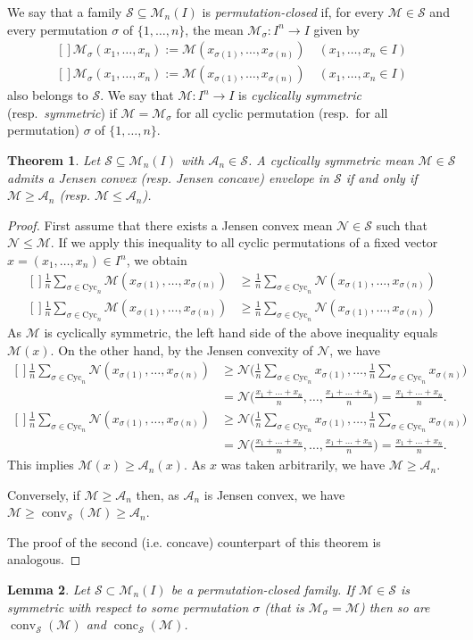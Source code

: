 \documentclass[12pt,oneside]{amsart}
\newtheorem{thm}{Theorem}[section]
\newtheorem{lem}[thm]{Lemma}
\theoremstyle{definition}
\numberwithin{equation}{section}
\def\Eq#1#2{\ifthenelse{\equal{#1}{*}}
  {\begin{equation*}\begin{aligned}[]#2\end{aligned}\end{equation*}}
  {\begin{equation}\begin{aligned}[]\label{#1}#2\end{aligned}\end{equation}}}
\def\A{\mathscr{A}}
\def\M{\mathscr{M}}
\def\Nm{\mathscr{N}}
\def\S{\mathcal{S}}
\def\calM{\mathcal{M}}
\newcommand\Cyc{\textrm{Cyc}}
\DeclareMathOperator{\conv}{conv}
\DeclareMathOperator{\conc}{conc}
\begin{document}
We say that a family $\S \subseteq \calM_n(I)$ is \emph{permutation-closed} if, for every $\M \in \S$ and every permutation $\sigma$ of $\{1,\dots,n\}$, the mean $\M_\sigma\colon I^n \to I$ given by
\Eq{*}{
\M_{\sigma}(x_1,\dots,x_n):= \M(x_{\sigma(1)},\dots,x_{\sigma(n)})
\quad (x_1,\dots,x_n \in I)}
also belongs to $\S$. We say that $\M\colon I^n\to I$ is \emph{cyclically symmetric} (resp.\ \emph{symmetric}) if $\M=\M_\sigma$ for all cyclic permutation (resp.\ for all permutation) $\sigma$ of $\{1,\dots,n\}$. 

\begin{thm}\label{thm:M-A}
Let $\S\subseteq\calM_n(I)$ with $\A_n \in \S$. A cyclically symmetric mean $\M \in \S$ admits a Jensen convex (resp. Jensen concave) envelope in $\S$ if and only if $\M \ge \A_n$ (resp. $\M \le \A_n$). 
\end{thm}

\begin{proof} 
 First assume that there exists a Jensen convex mean $\Nm \in \S$ such that $\Nm \le \M$. 
 If we apply this inequality to all cyclic permutations of a fixed vector $x=(x_1,\dots,x_n)\in I^n$, we obtain
 \Eq{*}{
\frac1n  \sum_{\sigma \in \Cyc_n} \M(x_{\sigma(1)},\dots,x_{\sigma(n)})
 &\ge \frac1n \sum_{\sigma \in \Cyc_n} \Nm(x_{\sigma(1)},\dots,x_{\sigma(n)})
 }
As $\M$ is cyclically symmetric, the left hand side of the above inequality equals $\M(x)$. On the other hand, by the Jensen convexity of $\Nm$, we have
\Eq{*}{
\frac1n \sum_{\sigma \in \Cyc_n} \Nm(x_{\sigma(1)},\dots,x_{\sigma(n)})
&\ge \Nm\bigg(\frac1n \sum_{\sigma \in \Cyc_n} x_{\sigma(1)},\dots,\frac1n \sum_{\sigma \in \Cyc_n} x_{\sigma(n)}\bigg)\\
&= \Nm\bigg(\frac{x_1+\dots+x_n}n,\dots,\frac{x_1+\dots+x_n}n\bigg)=\frac{x_1+\dots+x_n}n.
}
This implies $\M(x)\ge\A_n(x)$. As $x$ was taken arbitrarily, we have $\M\ge\A_n$.

Conversely, if $\M  \ge \A_n$ then, as $\A_n$ is Jensen convex, we have $\M \ge \conv_\S(\M)\ge \A_n$. 

The proof of the second (i.e. concave) counterpart of this theorem is analogous.
\end{proof}

\begin{lem}
Let $\S \subset \calM_n(I)$ be a permutation-closed family.
 If $\M \in \S$ is symmetric with respect to some permutation $\sigma$ (that is $\M_\sigma=\M$) then so are $\conv_\S(\M)$ and $\conc_\S(\M)$.
\end{lem}
\end{document}
